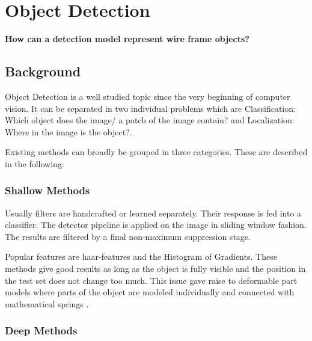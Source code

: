 	\chapter{Object Detection}
	\label{sec:object_detection}
	
	\begin{center}
		\textbf{ How can a detection model represent wire frame objects?}
	\end{center}

	
	\section{Background}
	
	Object Detection is a well studied topic since the very beginning of computer vision. It can be separated in two individual problems which are Classification: Which object does the image/ a patch of the image contain? and Localization: Where in the image is the object?.
	
	Existing methods can broadly be grouped in three categories. These are described in the following:

	\subsection{Shallow Methods}
	
	Usually filters are handcrafted or learned separately. Their response is fed into a classifier. The detector pipeline is applied on the image in sliding window fashion. The results are filtered by a final non-maximum suppression stage. 

	Popular features are haar-features \cite{Viola2004} and the Histogram of Gradients\cite{Forsyth}. These methods give good results as long as the object is fully visible and the position in the test set does not change too much. This issue gave raise to deformable part models where parts of the object are modeled individually and connected with mathematical springs \cite{Viola2004}.
	\subsection{Deep Methods}
